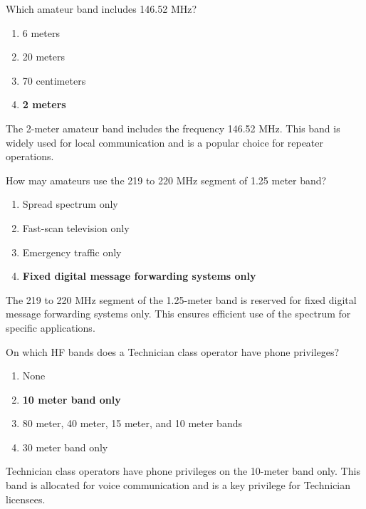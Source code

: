 
\begin{tcolorbox}[colback=gray!10!white,colframe=black!75!black,title={T1B04}]
    Which amateur band includes 146.52 MHz?
    \begin{enumerate}[label=\Alph*),noitemsep]
        \item 6 meters
        \item 20 meters
        \item 70 centimeters
        \item \textbf{2 meters}
    \end{enumerate}
\end{tcolorbox}
The 2-meter amateur band includes the frequency 146.52 MHz. This band is widely used for local communication and is a popular choice for repeater operations.


\begin{tcolorbox}[colback=gray!10!white,colframe=black!75!black,title={T1B05}]
    How may amateurs use the 219 to 220 MHz segment of 1.25 meter band?
    \begin{enumerate}[label=\Alph*),noitemsep]
        \item Spread spectrum only
        \item Fast-scan television only
        \item Emergency traffic only
        \item \textbf{Fixed digital message forwarding systems only}
    \end{enumerate}
\end{tcolorbox}
The 219 to 220 MHz segment of the 1.25-meter band is reserved for fixed digital message forwarding systems only. This ensures efficient use of the spectrum for specific applications.


\begin{tcolorbox}[colback=gray!10!white,colframe=black!75!black,title={T1B06}]
    On which HF bands does a Technician class operator have phone privileges?
    \begin{enumerate}[label=\Alph*),noitemsep]
        \item None
        \item \textbf{10 meter band only}
        \item 80 meter, 40 meter, 15 meter, and 10 meter bands
        \item 30 meter band only
    \end{enumerate}
\end{tcolorbox}
Technician class operators have phone privileges on the 10-meter band only. This band is allocated for voice communication and is a key privilege for Technician licensees.

